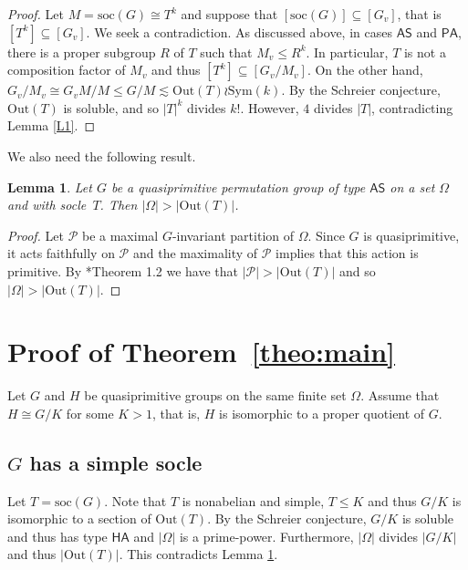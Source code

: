 \documentclass[twoside,12pt,leqno]{amsproc}
\numberwithin{table}{section}
\numberwithin{figure}{section}
\theoremstyle{plain}
\newtheorem{lemma}[theorem]{Lemma}
\theoremstyle{definition}\newtheorem{definition}[theorem]{Definition}
\theoremstyle{definition}\newtheorem{example}[theorem]{Example}
\theoremstyle{definition}\newtheorem{construction}[theorem]{Construction}
\theoremstyle{definition}\newtheorem{remark}[theorem]{Remark}
\theoremstyle{definition}\newtheorem{problem}[theorem]{Problem}
\begin{document}
\begin{proof}
Let $M={{\mathrm{soc}}}(G)\cong T^k$ and suppose that $[{{\mathrm{soc}}}(G)]\subseteq [G_v]$, that is $[T^k]\subseteq [G_v]$. We seek a contradiction. As discussed above, in cases ${\mathsf{AS}}$ and ${\mathsf{PA}}$, there is a proper subgroup $R$ of $T$ such that $M_v\leqslant R^k$. In particular, $T$ is not a composition factor of $M_v$ and thus $[T^k]\subseteq [G_v/M_v]$. On the other hand, $G_v/M_v\cong G_vM/M\leqslant G/M\lesssim {\mathrm{Out}}(T)\wr {\mathrm{Sym}}(k)$.  By the Schreier conjecture, ${\mathrm{Out}}(T)$ is soluble, and so $|T|^k$ divides $k!$. However, $4$ divides $|T|$,  contradicting Lemma \ref{L1}.
\end{proof}

We also need the following result.

\begin{lemma}\label{lem:outT}
Let $G$ be a quasiprimitive permutation group of type ${\mathsf{AS}}$ on a set $\Omega$ and with socle~$T$. Then $|\Omega|>|{\mathrm{Out}}(T)|$.
\end{lemma}
\begin{proof}
Let $\mathcal{P}$ be a maximal $G$-invariant partition of  $\Omega$. Since $G$ is quasiprimitive, it acts faithfully on $\mathcal{P}$ and the maximality of $\mathcal{P}$ implies that this action is primitive. By \cite{GMP}*{Theorem 1.2} we have that $|\mathcal{P}|>|{\mathrm{Out}}(T)|$ and so $|\Omega|>|{\mathrm{Out}}(T)|$.
\end{proof}

\section{Proof of Theorem~\ref{theo:main}}\label{S2}

Let $G$ and $H$ be quasiprimitive groups on the same finite set $\Omega$. Assume that $H\cong G/K$ for some $K>1$, that is, $H$ is  isomorphic to a proper quotient of $G$.

\subsection{$G$ has a simple socle}\label{sec:first}

Let $T={{\mathrm{soc}}}(G)$. Note that $T$ is nonabelian  and simple, $T{\leqslant} K$ and thus  $G/K$ is isomorphic to a section of ${\mathrm{Out}}(T)$. By  the Schreier conjecture, $G/K$ is soluble and thus has type ${\mathsf{HA}}$ and $|\Omega|$ is a prime-power. Furthermore, $|\Omega|$ divides $|G/K|$ and thus $|{\mathrm{Out}}(T)|$.  This contradicts Lemma \ref{lem:outT}. 
\end{document}

